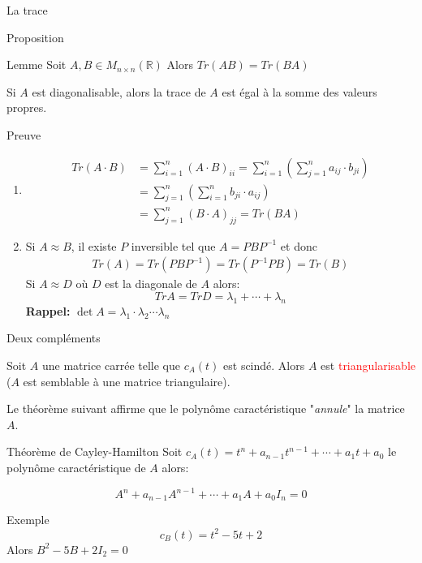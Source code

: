 \begin{parag}{La trace}
\begin{subparag}{Proposition}
        \begin{theoreme}{Lemme}
            Soit $A, B \in M_{n \times n}(\mathbb{R}) $ Alors $Tr(AB) = Tr(BA)$
        \end{theoreme}
        \begin{theoreme}
            Si $A$ est diagonalisable, alors la trace de $A$ est égal à la somme des valeurs propres.
        \end{theoreme}
    \end{subparag}
    \begin{subparag}{Preuve}
        \begin{enumerate}
            \item 
            \begin{align*}
            Tr(A\cdot B) &= \sum_{i = 1}^n(A \cdot B)_{ii} = \sum_{i = 1}^n(\sum_{j=1}^n a_{ij}\cdot b_{ji})\\
            &= \sum_{j=1}^n(\sum_{i=1}^n b_{ji}\cdot a_{ij})\\
            &= \sum_{j=1}^n (B\cdot A)_{jj} = Tr(BA)
            \end{align*}
            \item Si $A \approx B$, il existe $P$ inversible tel que $A = PBP^{-1}$ et donc 
            \begin{align*}
                Tr(A) = Tr(PBP^{-1}) = Tr(P^{-1}PB) = Tr(B)
            \end{align*}
            Si $A \approx D $ où $D$ est la diagonale de $A$ alors:
            \[TrA = TrD = \lambda_1 + \cdots + \lambda_n\]
            \textbf{Rappel:} $\det A = \lambda_1\cdot \lambda_2 \cdots \lambda_n$
        \end{enumerate}
    \end{subparag}
    
\end{parag}
\begin{parag}{Deux compléments}
    \begin{theoreme}
        Soit $A$ une matrice carrée telle que $c_A(t)$ est scindé. Alors $A$ est  \textcolor{red}{triangularisable} ($A$ est semblable à une matrice triangulaire).
    \end{theoreme}
    Le théorème suivant affirme que le polynôme caractéristique "\textit{annule}" la matrice $A$.
    \begin{theoreme}{Théorème de Cayley-Hamilton}
        Soit $c_A(t) = t^n + a_{n-1}t^{n-1} + \cdots + a_1 t + a_0$ le polynôme caractéristique de $A$ alors:
        \begin{formule}
            \[A^n + a_{n-1}A^{n-1} + \cdots + a_1A + a_0I_n = 0\]
        \end{formule}
    \end{theoreme}
    \begin{subparag}{Exemple}
        \[c_B(t) = t^2 - 5t + 2\]
        Alors $B^2 - 5B + 2I_2 = 0$
    \end{subparag}
\end{parag}
